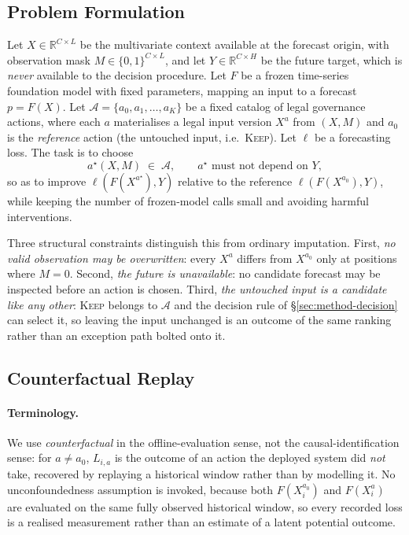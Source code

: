\documentclass{article}
\newcommand{\calA}{\mathcal{A}}
\newcommand{\loss}{\ell}
\begin{document}
\subsection{Problem Formulation}
\label{sec:method-problem}
Let $X \in \mathbb{R}^{C \times L}$ be the multivariate context available at the forecast
origin, with observation mask $M \in \{0,1\}^{C \times L}$, and let
$Y \in \mathbb{R}^{C \times H}$ be the future target, which is \emph{never} available to
the decision procedure. Let $F$ be a frozen time-series foundation model with fixed
parameters, mapping an input to a forecast $p = F(X)$. Let
$\calA = \{a_0, a_1, \dots, a_K\}$ be a fixed catalog of legal governance actions, where
each $a$ materialises a legal input version $X^{a}$ from $(X, M)$ and $a_0$ is the
\emph{reference} action (the untouched input, i.e.\ \textsc{Keep}). Let $\loss$ be a
forecasting loss. The task is to choose
\begin{equation}
  a^\star(X, M) \;\in\; \calA,
  \qquad
  a^\star \text{ must not depend on } Y ,
  \label{eq:objective}
\end{equation}
so as to improve $\loss(F(X^{a^\star}), Y)$ relative to the reference
$\loss(F(X^{a_0}), Y)$, while keeping the number of frozen-model calls small and avoiding
harmful interventions.

Three structural constraints distinguish this from ordinary imputation. First, \emph{no
valid observation may be overwritten}: every $X^{a}$ differs from $X^{a_0}$ only at
positions where $M = 0$. Second, \emph{the future is unavailable}: no candidate forecast
may be inspected before an action is chosen. Third, \emph{the untouched input is a
candidate like any other}: \textsc{Keep} belongs to $\calA$ and the decision rule of
\S\ref{sec:method-decision} can select it, so leaving the input unchanged is an outcome of
the same ranking rather than an exception path bolted onto it.

\subsection{Counterfactual Replay}
\label{sec:method-replay}
\paragraph{Terminology.}
We use \emph{counterfactual} in the offline-evaluation sense, not the causal-identification
sense: for $a \neq a_0$, $L_{i,a}$ is the outcome of an action the deployed system did
\emph{not} take, recovered by replaying a historical window rather than by modelling it. No
unconfoundedness assumption is invoked, because both $F(X_i^{a_0})$ and $F(X_i^{a})$ are
evaluated on the same fully observed historical window, so every recorded loss is a
realised measurement rather than an estimate of a latent potential outcome.
\end{document}
